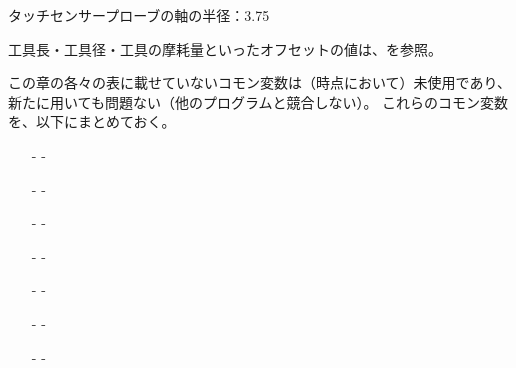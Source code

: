 \begin{hosoku}
タッチセンサープローブの軸の半径：3.75
\end{hosoku}
\begin{hosoku}
工具長・工具径・工具の摩耗量といったオフセットの値は、を参照。
\end{hosoku}



\clearpage
この章の各々の表に載せていないコモン変数は（\dateUnusedVariables 時点において）未使用であり、新たに用いても問題ない（他のプログラムと競合しない）。
これらのコモン変数を、以下にまとめておく。
\begin{enumerate}
\item[-] -
\item[-] -
\item[-] -
\item[-] -
\item[-] -
\item[-] -
\item[-] -
\end{enumerate}


